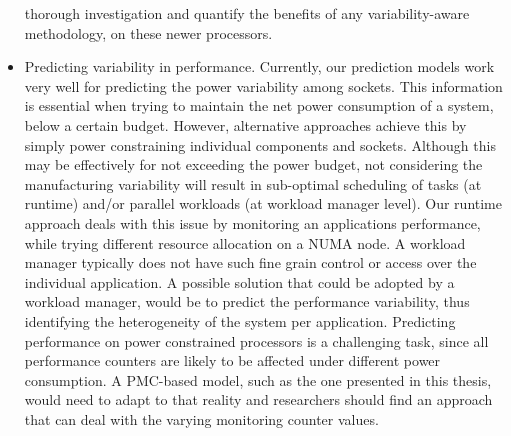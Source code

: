 \begin{itemize}
thorough investigation and quantify the benefits of any variability-aware methodology, on
these newer processors.
	\item Predicting variability in performance.  Currently, our prediction models work very
well for predicting the power variability among sockets.  This information is essential
when trying to maintain the net power consumption of a system, below a certain budget.
However, alternative approaches achieve this by simply power constraining individual
components and sockets.  Although this may be effectively for not exceeding the power
budget, not considering the manufacturing variability will result in sub-optimal
scheduling of tasks (at runtime) and/or parallel workloads (at workload manager level).
Our runtime approach deals with this issue by monitoring an applications performance,
while trying different resource allocation on a NUMA node.  A workload manager typically
does not have such fine grain control or access over the individual application.  A
possible solution that could be adopted by a workload manager, would be to predict the
performance variability, thus identifying the heterogeneity of the system per application.
Predicting performance on power constrained processors is a challenging task, since all
performance counters are likely to be affected under different power consumption.  A
PMC-based model, such as the one presented in this thesis, would need to adapt to that
reality and researchers should find an approach that can deal with the varying monitoring
counter values.
\end{itemize}


